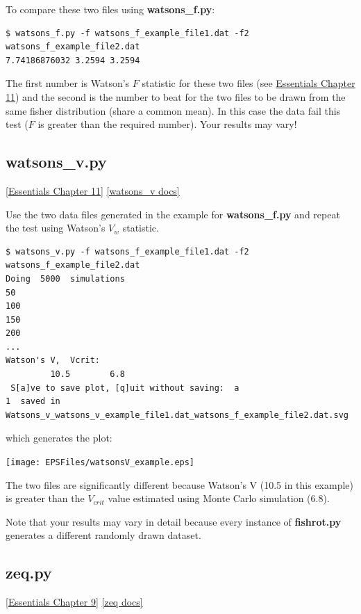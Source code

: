 \documentclass[11pt]{book}
\begin{document}
{{{To compare these two files using {\bf watsons\_f.py}:

\begin{verbatim}
$ watsons_f.py -f watsons_f_example_file1.dat -f2 watsons_f_example_file2.dat
7.74186876032 3.2594 3.2594
\end{verbatim}

The first number is Watson's  $F$ statistic for these two files (see \href{http://earthref.org/MAGIC/books/Tauxe/Essentials/WebBook3ch11.html#ch11}{Essentials Chapter 11}) and the second is the number to beat for the two files to be drawn from the same fisher distribution (share a common mean).   In this case  the data fail this test ($F$ is greater than the required number).    Your results may vary!

\subsection{watsons\_v.py}
\href{http://earthref.org/MAGIC/books/Tauxe/Essentials/WebBook3ch11.html#ch11}{[Essentials Chapter 11]}
\href{https://github.com/PmagPy/PmagPy/blob/master/programs/watsons\_v.py}{[watsons\_v docs]}


Use the two data files generated in the example for {\bf watsons\_f.py} and repeat the test using Watson's $V_w$ statistic.

\begin{verbatim}
$ watsons_v.py -f watsons_f_example_file1.dat -f2 watsons_f_example_file2.dat
Doing  5000  simulations
50
100
150
200
...
Watson's V,  Vcrit:
         10.5        6.8
 S[a]ve to save plot, [q]uit without saving:  a
1  saved in  Watsons_v_watsons_v_example_file1.dat_watsons_f_example_file2.dat.svg
       \end{verbatim}

\noindent  which generates the plot:


\texttt{[image: EPSFiles/watsonsV\_example.eps]}

 The two files are significantly different because Watson's V (10.5 in this example) is greater than the $V_{crit}$ value estimated using Monte Carlo simulation (6.8).

 Note that your results may vary in detail because every instance of {\bf fishrot.py}  generates  a different randomly drawn dataset.

%
\subsection{zeq.py}
\href{http://earthref.org/MAGIC/books/Tauxe/Essentials/WebBook3ch9.html#ch9}{[Essentials Chapter 9]}
\href{https://github.com/PmagPy/PmagPy/blob/master/programs/zeq.py}{[zeq docs]}

}}}
\end{document}
